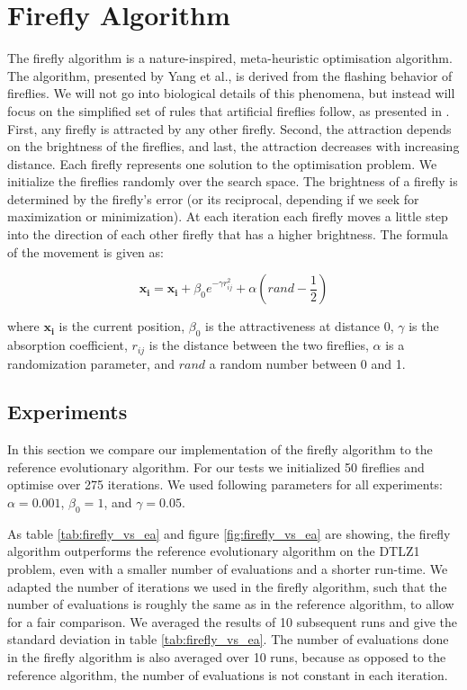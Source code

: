 \section{Firefly Algorithm}

The firefly algorithm is a nature-inspired, meta-heuristic optimisation
algorithm. The algorithm, presented by Yang et al., is derived from the
flashing behavior of fireflies. We will not go into biological details of this
phenomena, but instead will focus on the simplified set of rules that
artificial fireflies follow, as presented in \cite{firefly}. First, any firefly
is attracted by any other firefly. Second, the attraction depends on the
brightness of the fireflies, and last, the attraction decreases with increasing
distance.  Each firefly represents one solution to the optimisation problem. We
initialize the fireflies randomly over the search space. The brightness of a
firefly is determined by the firefly's error (or its reciprocal, depending if
we seek for maximization or minimization). At each iteration each firefly
moves a little step into the direction of each other firefly that has a higher
brightness. The formula of the movement is given as:

\begin{equation}
    \mathbf{x_i} = \mathbf{x_i} + \beta_0 e^{-\gamma r_{ij}^2} + \alpha (rand - \frac{1}{2})
\end{equation}

where $\mathbf{x_i}$ is the current position, $\beta_0$ is the attractiveness
at distance 0, $\gamma$ is the absorption coefficient, $r_{ij}$ is the distance
between the two fireflies, $\alpha$ is a randomization parameter, and $rand$ a
random number between 0 and 1.

\subsection{Experiments}

In this section we compare our implementation of the firefly algorithm to the
reference evolutionary algorithm. For our tests we initialized 50 fireflies and
optimise over 275 iterations. We used following parameters for all experiments:
$\alpha = 0.001$, $\beta_0 = 1$, and $\gamma = 0.05$.

As table \ref{tab:firefly_vs_ea} and figure \ref{fig:firefly_vs_ea} are
showing, the firefly algorithm outperforms the reference evolutionary algorithm
on the DTLZ1 problem, even with a smaller number of evaluations and a shorter
run-time. We adapted the number of iterations we used in the firefly algorithm,
such that the number of evaluations is roughly the same as in the reference
algorithm, to allow for a fair comparison. We averaged the results of 10
subsequent runs and give the standard deviation in table
\ref{tab:firefly_vs_ea}. The number of evaluations done in the firefly
algorithm is also averaged over 10 runs, because as opposed to the reference
algorithm, the number of evaluations is not constant in each iteration.

